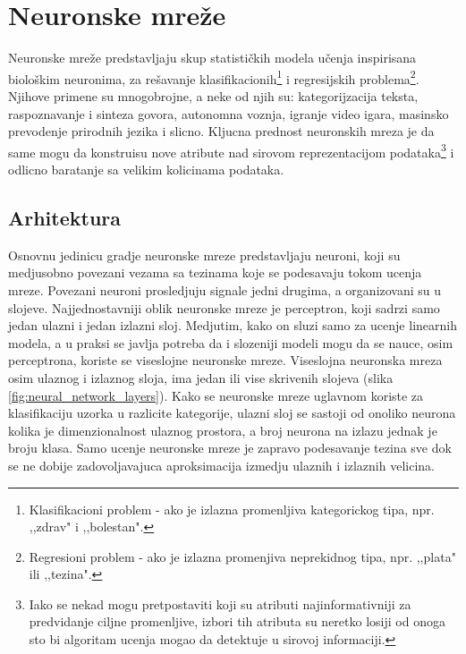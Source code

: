\documentclass[a4paper]{article}
\begin{document}
\newpage

\section{Neuronske mreže}
\label{sec:cnn}

Neuronske mreže predstavljaju skup statističkih modela učenja inspirisana biološkim neuronima, za rešavanje klasifikacionih\footnote{Klasifikacioni problem - ako je izlazna promenljiva kategorickog tipa, npr. ,,zdrav" i ,,bolestan".} i regresijskih problema\footnote{Regresioni problem - ako je izlazna promenjiva neprekidnog tipa, npr. ,,plata" ili ,,tezina".}. Njihove primene su mnogobrojne, a neke od njih su: kategorijzacija teksta,
 raspoznavanje i sinteza govora, autonomna voznja, igranje video igara, masinsko prevodenje prirodnih jezika i slicno. Kljucna prednost neuronskih mreza je da same mogu da konstruisu nove atribute nad sirovom reprezentacijom podataka\footnote{Iako se nekad mogu pretpostaviti koji su atributi najinformativniji za predvidanje ciljne promenljive, izbori tih atributa su neretko losiji od onoga sto bi algoritam ucenja mogao da detektuje u sirovoj informaciji.} i odlicno baratanje sa velikim kolicinama podataka.


\subsection{Arhitektura}

Osnovnu jedinicu gradje neuronske mreze predstavljaju neuroni, koji su medjusobno povezani vezama sa tezinama koje se podesavaju tokom ucenja mreze. Povezani neuroni prosledjuju signale jedni drugima, a organizovani su u slojeve. Najjednostavniji oblik neuronske mreze je perceptron, koji sadrzi samo jedan ulazni i jedan izlazni sloj. Medjutim, kako on sluzi samo za ucenje linearnih modela, a u praksi se javlja potreba da i slozeniji modeli mogu da se nauce, osim perceptrona, koriste se viseslojne neuronske mreze. Viseslojna neuronska mreza osim ulaznog i izlaznog sloja, ima jedan ili vise skrivenih slojeva (slika \ref{fig:neural_network_layers}).
Kako se neuronske mreze uglavnom koriste za klasifikaciju uzorka u razlicite kategorije, ulazni sloj se sastoji od onoliko neurona kolika je dimenzionalnost ulaznog prostora, a broj neurona na izlazu jednak je broju klasa. Samo ucenje neuronske mreze je zapravo podesavanje tezina sve dok se ne dobije zadovoljavajuca aproksimacija izmedju ulaznih i izlaznih velicina.
\end{document}
